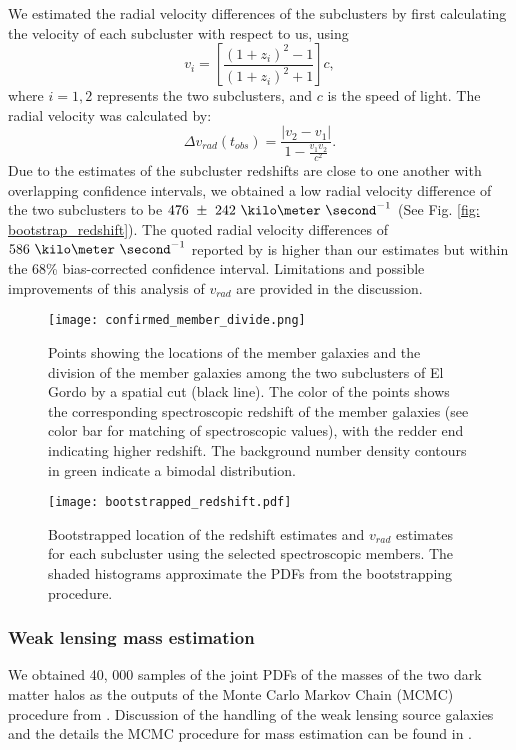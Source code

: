 We estimated the radial velocity differences of the
subclusters by first calculating the velocity of each subcluster with
respect to us, using  
\begin{equation}
	v_i = \left[ \frac{(1+z_i)^2 - 1 }{(1+z_i)^2 + 1 }\right]c,
\end{equation}
where $i=1, 2$ represents the two subclusters, and $c$ is the speed of
light. The radial velocity was calculated by: 
\begin{equation}
	\Delta v_{rad}(t_{obs}) = \frac{|v_2 - v_1|}{1-\frac{v_1 v_2}{c^2}}.
\end{equation}
Due to the estimates of the subcluster redshifts are close to
one another with overlapping confidence intervals, we obtained a low 
radial velocity difference of the two subclusters to be
$476~\pm~242~\kilo\meter~\second^{-1}$ (See Fig. \ref{fig:
bootstrap_redshift}). 
The quoted radial velocity differences of $586~\kilo \meter~\second^{-1}$ reported by  
is higher than our estimates but within the 68\% bias-corrected
confidence interval. Limitations and possible improvements of this analysis
of $v_{rad}$ are provided in the discussion. 
\begin{figure}
	\texttt{[image: confirmed\_member\_divide.png]}
	\caption{\label{fig:membership} Points showing the locations of the
	member galaxies and the division of the member galaxies among the two subclusters of El Gordo by a spatial cut
(black line). The color of the points shows the corresponding spectroscopic
redshift of the member galaxies (see color bar for matching of
spectroscopic values), with the redder end indicating higher
redshift. The background number density contours in green indicate a bimodal
distribution.} 
\end{figure}
\begin{figure}
	\texttt{[image: bootstrapped\_redshift.pdf]}
	\caption{\label{fig: bootstrap_redshift} Bootstrapped location of the
	redshift estimates and $v_{rad}$ estimates for each subcluster using the
	selected spectroscopic members. The shaded histograms approximate the
	PDFs from the bootstrapping procedure.
} 
\end{figure}
\subsubsection{Weak lensing mass estimation} 
We obtained 40, 000 samples of the joint PDFs of the masses of the two dark
matter halos as the outputs of the Monte Carlo Markov Chain (MCMC)
procedure from \citealt{Jee13}. Discussion of the handling of the weak
lensing source galaxies and the details the MCMC procedure for mass
estimation can be found in \citealt{Jee13}. 

